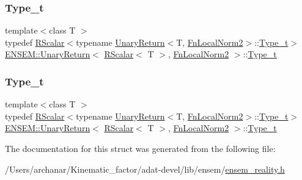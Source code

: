 \subsubsection{\texorpdfstring{Type\_t}{Type\_t}\hspace{0.1cm}{\footnotesize\ttfamily [2/3]}}
{\footnotesize\ttfamily template$<$class T $>$ \\
typedef \mbox{\hyperlink{classENSEM_1_1RScalar}{R\+Scalar}}$<$typename \mbox{\hyperlink{structENSEM_1_1UnaryReturn}{Unary\+Return}}$<$T, \mbox{\hyperlink{structENSEM_1_1FnLocalNorm2}{Fn\+Local\+Norm2}}$>$\+::\mbox{\hyperlink{structENSEM_1_1UnaryReturn_3_01RScalar_3_01T_01_4_00_01FnLocalNorm2_01_4_ab989f2d45f35f7fcfa14b6b5f12d66f4}{Type\+\_\+t}}$>$ \mbox{\hyperlink{structENSEM_1_1UnaryReturn}{E\+N\+S\+E\+M\+::\+Unary\+Return}}$<$ \mbox{\hyperlink{classENSEM_1_1RScalar}{R\+Scalar}}$<$ T $>$, \mbox{\hyperlink{structENSEM_1_1FnLocalNorm2}{Fn\+Local\+Norm2}} $>$\+::\mbox{\hyperlink{structENSEM_1_1UnaryReturn_3_01RScalar_3_01T_01_4_00_01FnLocalNorm2_01_4_ab989f2d45f35f7fcfa14b6b5f12d66f4}{Type\+\_\+t}}}

\mbox{\label{structENSEM_1_1UnaryReturn_3_01RScalar_3_01T_01_4_00_01FnLocalNorm2_01_4_ab989f2d45f35f7fcfa14b6b5f12d66f4}} 
\subsubsection{\texorpdfstring{Type\_t}{Type\_t}\hspace{0.1cm}{\footnotesize\ttfamily [3/3]}}
{\footnotesize\ttfamily template$<$class T $>$ \\
typedef \mbox{\hyperlink{classENSEM_1_1RScalar}{R\+Scalar}}$<$typename \mbox{\hyperlink{structENSEM_1_1UnaryReturn}{Unary\+Return}}$<$T, \mbox{\hyperlink{structENSEM_1_1FnLocalNorm2}{Fn\+Local\+Norm2}}$>$\+::\mbox{\hyperlink{structENSEM_1_1UnaryReturn_3_01RScalar_3_01T_01_4_00_01FnLocalNorm2_01_4_ab989f2d45f35f7fcfa14b6b5f12d66f4}{Type\+\_\+t}}$>$ \mbox{\hyperlink{structENSEM_1_1UnaryReturn}{E\+N\+S\+E\+M\+::\+Unary\+Return}}$<$ \mbox{\hyperlink{classENSEM_1_1RScalar}{R\+Scalar}}$<$ T $>$, \mbox{\hyperlink{structENSEM_1_1FnLocalNorm2}{Fn\+Local\+Norm2}} $>$\+::\mbox{\hyperlink{structENSEM_1_1UnaryReturn_3_01RScalar_3_01T_01_4_00_01FnLocalNorm2_01_4_ab989f2d45f35f7fcfa14b6b5f12d66f4}{Type\+\_\+t}}}



The documentation for this struct was generated from the following file\+:\begin{DoxyCompactItemize}
\item 
/\+Users/archanar/\+Kinematic\+\_\+factor/adat-\/devel/lib/ensem/\mbox{\hyperlink{adat-devel_2lib_2ensem_2ensem__reality_8h}{ensem\+\_\+reality.\+h}}\end{DoxyCompactItemize}
